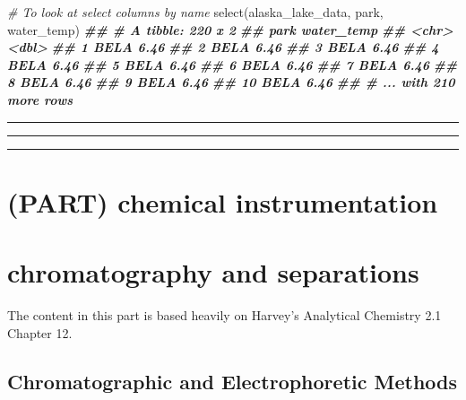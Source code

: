 \documentclass[
]{krantz}
\newenvironment{Shaded}{\begin{snugshade}}{\end{snugshade}}
\newcommand{\CommentTok}[1]{\textcolor[rgb]{0.56,0.35,0.01}{\textit{#1}}}
\newcommand{\DocumentationTok}[1]{\textcolor[rgb]{0.56,0.35,0.01}{\textbf{\textit{#1}}}}
\newcommand{\FunctionTok}[1]{\textcolor[rgb]{0.00,0.00,0.00}{#1}}
\newcommand{\NormalTok}[1]{#1}
\begin{document}
\begin{Shaded}
\begin{Highlighting}[]
\CommentTok{\# To look at select columns by name}
\FunctionTok{select}\NormalTok{(alaska\_lake\_data, park, water\_temp)}
\DocumentationTok{\#\# \# A tibble: 220 x 2}
\DocumentationTok{\#\#    park  water\_temp}
\DocumentationTok{\#\#    \textless{}chr\textgreater{}      \textless{}dbl\textgreater{}}
\DocumentationTok{\#\#  1 BELA        6.46}
\DocumentationTok{\#\#  2 BELA        6.46}
\DocumentationTok{\#\#  3 BELA        6.46}
\DocumentationTok{\#\#  4 BELA        6.46}
\DocumentationTok{\#\#  5 BELA        6.46}
\DocumentationTok{\#\#  6 BELA        6.46}
\DocumentationTok{\#\#  7 BELA        6.46}
\DocumentationTok{\#\#  8 BELA        6.46}
\DocumentationTok{\#\#  9 BELA        6.46}
\DocumentationTok{\#\# 10 BELA        6.46}
\DocumentationTok{\#\# \# ... with 210 more rows}
\end{Highlighting}
\end{Shaded}

\begin{center}\rule{0.5\linewidth}{0.5pt}\end{center}

\begin{center}\rule{0.5\linewidth}{0.5pt}\end{center}

\begin{center}\rule{0.5\linewidth}{0.5pt}\end{center}

\hypertarget{part-chemical-instrumentation}{%
\section{(PART) chemical instrumentation}\label{part-chemical-instrumentation}}

\hypertarget{chromatography-and-separations}{%
\section{chromatography and separations}\label{chromatography-and-separations}}

The content in this part is based heavily on Harvey's Analytical Chemistry 2.1 Chapter 12.

\hypertarget{chromatographic-and-electrophoretic-methods}{%
\subsection{Chromatographic and Electrophoretic Methods}\label{chromatographic-and-electrophoretic-methods}}
\end{document}
